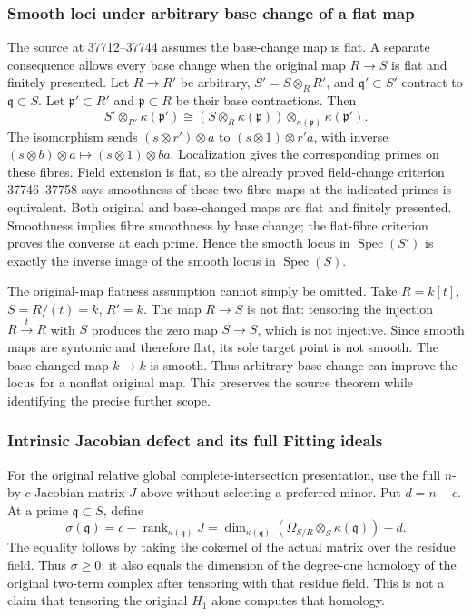 \subsubsection{Smooth loci under arbitrary base change of a flat map}\label{smooth-loci-under-arbitrary-base-change-of-a-flat-map}

The source at 37712--37744 assumes the base-change map is flat. A separate consequence allows every base change when the original map \(R\to S\) is flat and finitely presented. Let \(R\to R'\) be arbitrary, \(S'=S\otimes_RR'\), and \(\mathfrak q'\subset S'\) contract to \(\mathfrak q\subset S\). Let \(\mathfrak p'\subset R'\) and \(\mathfrak p\subset R\) be their base contractions. Then \[
S'\otimes_{R'}\kappa(\mathfrak p')
\cong
(S\otimes_R\kappa(\mathfrak p))\otimes_{\kappa(\mathfrak p)}\kappa(\mathfrak p').
\] The isomorphism sends \((s\otimes r')\otimes a\) to \((s\otimes1)\otimes r'a\), with inverse \((s\otimes b)\otimes a\mapsto(s\otimes1)\otimes ba\). Localization gives the corresponding primes on these fibres. Field extension is flat, so the already proved field-change criterion 37746--37758 says smoothness of these two fibre maps at the indicated primes is equivalent. Both original and base-changed maps are flat and finitely presented. Smoothness implies fibre smoothness by base change; the flat-fibre criterion proves the converse at each prime. Hence the smooth locus in \(\operatorname{Spec}(S')\) is exactly the inverse image of the smooth locus in \(\operatorname{Spec}(S)\).

The original-map flatness assumption cannot simply be omitted. Take \(R=k[t]\), \(S=R/(t)=k\), \(R'=k\). The map \(R\to S\) is not flat: tensoring the injection \(R\xrightarrow{t}R\) with \(S\) produces the zero map \(S\to S\), which is not injective. Since smooth maps are syntomic and therefore flat, its sole target point is not smooth. The base-changed map \(k\to k\) is smooth. Thus arbitrary base change can improve the locus for a nonflat original map. This preserves the source theorem while identifying the precise further scope.

\subsubsection{Intrinsic Jacobian defect and its full Fitting ideals}\label{intrinsic-jacobian-defect-and-its-full-fitting-ideals}

For the original relative global complete-intersection presentation, use the full \(n\)-by-\(c\) Jacobian matrix \(J\) above without selecting a preferred minor. Put \(d=n-c\). At a prime \(\mathfrak q\subset S\), define \[
\sigma(\mathfrak q)=c-\operatorname{rank}_{\kappa(\mathfrak q)}J
=\dim_{\kappa(\mathfrak q)}(\Omega_{S/R}\otimes_S\kappa(\mathfrak q))-d.
\] The equality follows by taking the cokernel of the actual matrix over the residue field. Thus \(\sigma\ge0\); it also equals the dimension of the degree-one homology of the original two-term complex after tensoring with that residue field. This is not a claim that tensoring the original \(H_1\) alone computes that homology.

